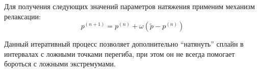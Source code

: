 Для получения следующих значений параметров натяжения применим механизм релаксации: $$p^{(n+1)} = p^{(n)} + \omega (\tilde{p} - p^{(n)})$$

Данный итеративный процесс позволяет дополнительно \enquote{натянуть} сплайн в интервалах с ложными точками перегиба, при этом он не всегда помогает бороться с ложными экстремумами.

\pagebreak

